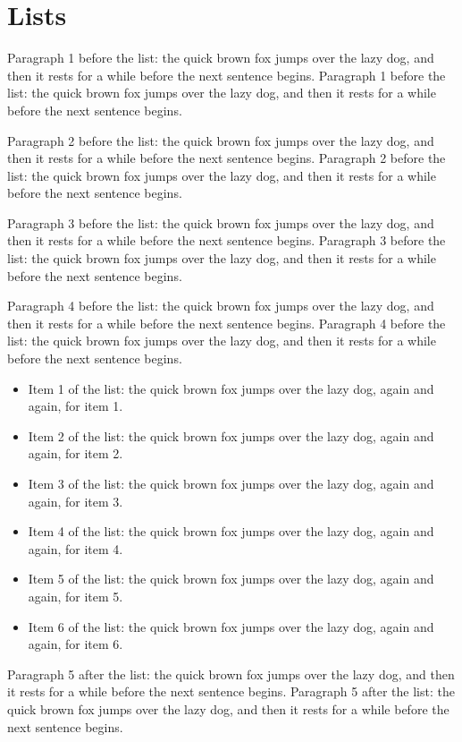 \documentclass{article}
\begin{document}
\begin{abstract}
This abstract says what the text is about: paragraphs, lists, a theorem, a figure and a quotation, each one a node of its own.
\end{abstract}

\section{Lists}
Paragraph 1 before the list: the quick brown fox jumps over the lazy dog, and then it rests for a while before the next sentence begins. Paragraph 1 before the list: the quick brown fox jumps over the lazy dog, and then it rests for a while before the next sentence begins. 

Paragraph 2 before the list: the quick brown fox jumps over the lazy dog, and then it rests for a while before the next sentence begins. Paragraph 2 before the list: the quick brown fox jumps over the lazy dog, and then it rests for a while before the next sentence begins. 

Paragraph 3 before the list: the quick brown fox jumps over the lazy dog, and then it rests for a while before the next sentence begins. Paragraph 3 before the list: the quick brown fox jumps over the lazy dog, and then it rests for a while before the next sentence begins. 

Paragraph 4 before the list: the quick brown fox jumps over the lazy dog, and then it rests for a while before the next sentence begins. Paragraph 4 before the list: the quick brown fox jumps over the lazy dog, and then it rests for a while before the next sentence begins. 

\begin{itemize}
\item Item 1 of the list: the quick brown fox jumps over the lazy dog, again and again, for item 1.

\item Item 2 of the list: the quick brown fox jumps over the lazy dog, again and again, for item 2.

\item Item 3 of the list: the quick brown fox jumps over the lazy dog, again and again, for item 3.

\item Item 4 of the list: the quick brown fox jumps over the lazy dog, again and again, for item 4.

\item Item 5 of the list: the quick brown fox jumps over the lazy dog, again and again, for item 5.

\item Item 6 of the list: the quick brown fox jumps over the lazy dog, again and again, for item 6.

\end{itemize}
Paragraph 5 after the list: the quick brown fox jumps over the lazy dog, and then it rests for a while before the next sentence begins. Paragraph 5 after the list: the quick brown fox jumps over the lazy dog, and then it rests for a while before the next sentence begins. 
\end{document}

